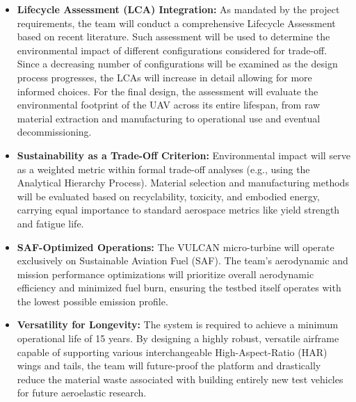 \begin{itemize}[leftmargin=*]
    \item \textbf{Lifecycle Assessment (LCA) Integration:} As mandated by the project requirements, the team will conduct a comprehensive Lifecycle Assessment based on recent literature. Such assessment will be used to determine the environmental impact of different configurations considered for trade-off. Since a decreasing number of configurations will be examined as the design process progresses, the LCAs will increase in detail allowing for more informed choices. For the final design, the assessment will evaluate the environmental footprint of the UAV across its entire lifespan, from raw material extraction and manufacturing to operational use and eventual decommissioning. 
    
    \item \textbf{Sustainability as a Trade-Off Criterion:} Environmental impact will serve as a weighted metric within formal trade-off analyses (e.g., using the Analytical Hierarchy Process). Material selection and manufacturing methods will be evaluated based on recyclability, toxicity, and embodied energy, carrying equal importance to standard aerospace metrics like yield strength and fatigue life.
    
    \item \textbf{SAF-Optimized Operations:} The VULCAN micro-turbine will operate exclusively on Sustainable Aviation Fuel (SAF). The team's aerodynamic and mission performance optimizations will prioritize overall aerodynamic efficiency and minimized fuel burn, ensuring the testbed itself operates with the lowest possible emission profile.
    
    \item \textbf{Versatility for Longevity:} The system is required to achieve a minimum operational life of 15 years. By designing a highly robust, versatile airframe capable of supporting various interchangeable High-Aspect-Ratio (HAR) wings and tails, the team will future-proof the platform and drastically reduce the material waste associated with building entirely new test vehicles for future aeroelastic research.
\end{itemize}
